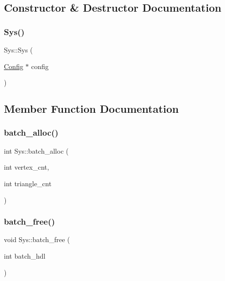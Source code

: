 \subsection{Constructor \& Destructor Documentation}
\mbox{\label{classSys_a74c59dd28249cf0968407b3d4f90ccab}} 
\subsubsection{\texorpdfstring{Sys()}{Sys()}}
{\footnotesize\ttfamily Sys\+::\+Sys (\begin{DoxyParamCaption}\item[{\mbox{\hyperlink{classConfig}{Config}} $\ast$}]{config }\end{DoxyParamCaption})}



\subsection{Member Function Documentation}
\mbox{\label{classSys_adc7a52fbbbb571b6588907ddc34ccdee}} 
\subsubsection{\texorpdfstring{batch\+\_\+alloc()}{batch\_alloc()}}
{\footnotesize\ttfamily int Sys\+::batch\+\_\+alloc (\begin{DoxyParamCaption}\item[{int}]{vertex\+\_\+cnt,  }\item[{int}]{triangle\+\_\+cnt }\end{DoxyParamCaption})}

\mbox{\label{classSys_a975e9e5bdbe0a8d0d091cc5e8045aa5f}} 
\subsubsection{\texorpdfstring{batch\+\_\+free()}{batch\_free()}}
{\footnotesize\ttfamily void Sys\+::batch\+\_\+free (\begin{DoxyParamCaption}\item[{int}]{batch\+\_\+hdl }\end{DoxyParamCaption})}

